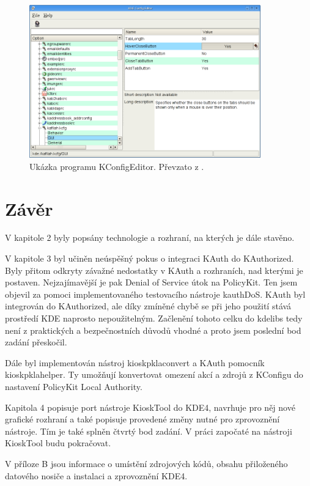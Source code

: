 \begin{figure}[h]
    \centering
    \includegraphics[width=10cm]{obrazky/kconfigeditor1.png}
    \caption{Ukázka programu KConfigEditor. Převzato z \cite{KConfigEditor}.}
    \label{fig:kconfeditor}
\end{figure}

\chapter{Závěr}
V kapitole 2 byly popsány technologie a rozhraní, na kterých je dále stavěno.

V kapitole 3 byl učiněn neúspěšný pokus o integraci KAuth do KAuthorized. Byly přitom odkryty závažné nedostatky v KAuth a rozhraních, nad kterými je postaven. Nejzajímavější je pak Denial of Service útok na PolicyKit. Ten jsem objevil za pomoci implementovaného testovacího nástroje kauthDoS. KAuth byl integrován do KAuthorized, ale díky zmíněné chybě se při jeho použití stává prostředí KDE naprosto nepoužitelným. Začlenění tohoto celku do kdelibs tedy není z praktických a bezpečnostních důvodů vhodné a proto jsem poslední bod zadání přeskočil.

Dále byl implementován nástroj kioskpklaconvert a KAuth pomocník kioskpklahelper. Ty umožňují konvertovat omezení akcí a zdrojů z KConfigu do nastavení PolicyKit Local Authority.

Kapitola 4 popisuje port nástroje KioskTool do KDE4, navrhuje pro něj nové grafické rozhraní a také popisuje provedené změny nutné pro zprovoznění nástroje. Tím je také splněn čtvrtý bod zadání. V práci započaté na nástroji KioskTool budu pokračovat.

V příloze B jsou informace o umístění zdrojových kódů, obsahu přiloženého datového nosiče a instalaci a zprovoznění KDE4.

\appendix
